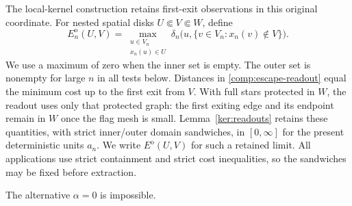 The local-kernel construction retains first-exit observations in
this original coordinate.  For nested spatial disks
$U\Subset V\Subset W$, define
\begin{equation}
 \label{comp:escape-readout}
 E_n^{\mathrm o}(U,V)=
 \max_{\substack{u\in V_n\\x_n(u)\in U}}
 \delta_n\bigl(u,\{v\in V_n:x_n(v)\notin V\}\bigr).
\end{equation}
We use a maximum of zero when the inner set is empty.  The
outer set is nonempty for large $n$ in all tests below.  Distances
in \eqref{comp:escape-readout} equal the minimum cost up to the
first exit from $V$.  With full stars protected in $W$, the
readout uses only that protected graph: the first exiting edge
and its endpoint remain in $W$ once the flag mesh is small.
Lemma~\ref{ker:readouts} retains these quantities, with strict
inner/outer domain sandwiches, in $[0,\infty]$ for the present
deterministic units $a_n$.  We write $E^{\mathrm o}(U,V)$ for such a
retained limit.  All applications use strict containment and strict cost
inequalities, so the sandwiches may be fixed before extraction.

\begin{proposition}
\label{comp:no-concentration}
The alternative $\alpha=0$ is impossible.
\end{proposition}

